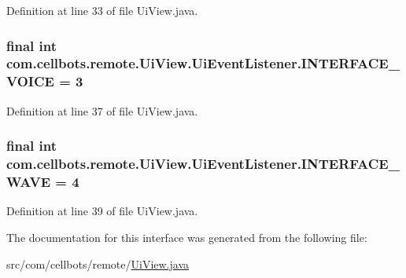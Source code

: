 Definition at line 33 of file Ui\-View.\-java.

\hypertarget{interfacecom_1_1cellbots_1_1remote_1_1_ui_view_1_1_ui_event_listener_ab7a89ffa7a4d961d8424f571f93b1593}{
\subsubsection[{I\-N\-T\-E\-R\-F\-A\-C\-E\-\_\-\-V\-O\-I\-C\-E}]{\setlength{\rightskip}{0pt plus 5cm}final int {\bf com.\-cellbots.\-remote.\-Ui\-View.\-Ui\-Event\-Listener.\-I\-N\-T\-E\-R\-F\-A\-C\-E\-\_\-\-V\-O\-I\-C\-E} = 3}}\label{interfacecom_1_1cellbots_1_1remote_1_1_ui_view_1_1_ui_event_listener_ab7a89ffa7a4d961d8424f571f93b1593}


Definition at line 37 of file Ui\-View.\-java.

\hypertarget{interfacecom_1_1cellbots_1_1remote_1_1_ui_view_1_1_ui_event_listener_af5bdc525e0470c6664092a4e2f601c89}{
\subsubsection[{I\-N\-T\-E\-R\-F\-A\-C\-E\-\_\-\-W\-A\-V\-E}]{\setlength{\rightskip}{0pt plus 5cm}final int {\bf com.\-cellbots.\-remote.\-Ui\-View.\-Ui\-Event\-Listener.\-I\-N\-T\-E\-R\-F\-A\-C\-E\-\_\-\-W\-A\-V\-E} = 4}}\label{interfacecom_1_1cellbots_1_1remote_1_1_ui_view_1_1_ui_event_listener_af5bdc525e0470c6664092a4e2f601c89}


Definition at line 39 of file Ui\-View.\-java.



The documentation for this interface was generated from the following file\-:\begin{DoxyCompactItemize}
\item 
src/com/cellbots/remote/\hyperlink{_ui_view_8java}{Ui\-View.\-java}\end{DoxyCompactItemize}
